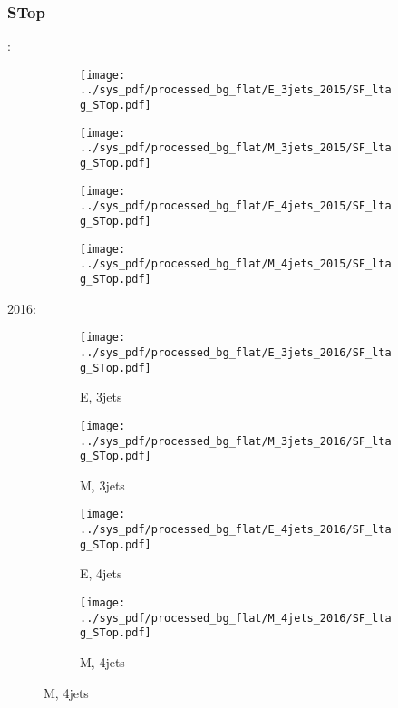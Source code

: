 \documentclass{beamer}
\begin{document}
\begin{frame}
\frametitle{STop}
\fontsize{5}{1}:
\begin{figure}
\centering
\begin{subfigure}[b]{0.24\textwidth}
\texttt{[image: ../sys\_pdf/processed\_bg\_flat/E\_3jets\_2015/SF\_ltag\_STop.pdf]}
\end{subfigure}
\begin{subfigure}[b]{0.24\textwidth}
\texttt{[image: ../sys\_pdf/processed\_bg\_flat/M\_3jets\_2015/SF\_ltag\_STop.pdf]}
\end{subfigure}
\begin{subfigure}[b]{0.24\textwidth}
\texttt{[image: ../sys\_pdf/processed\_bg\_flat/E\_4jets\_2015/SF\_ltag\_STop.pdf]}
\end{subfigure}
\begin{subfigure}[b]{0.24\textwidth}
\texttt{[image: ../sys\_pdf/processed\_bg\_flat/M\_4jets\_2015/SF\_ltag\_STop.pdf]}
\end{subfigure}
\end{figure}
2016:
\begin{figure}
\centering
\begin{subfigure}[b]{0.24\textwidth}
\texttt{[image: ../sys\_pdf/processed\_bg\_flat/E\_3jets\_2016/SF\_ltag\_STop.pdf]}
\captionsetup{font=tiny}
\caption{E, 3jets}
\end{subfigure}
\begin{subfigure}[b]{0.24\textwidth}
\texttt{[image: ../sys\_pdf/processed\_bg\_flat/M\_3jets\_2016/SF\_ltag\_STop.pdf]}
\captionsetup{font=tiny}
\caption{M, 3jets}
\end{subfigure}
\begin{subfigure}[b]{0.24\textwidth}
\texttt{[image: ../sys\_pdf/processed\_bg\_flat/E\_4jets\_2016/SF\_ltag\_STop.pdf]}
\captionsetup{font=tiny}
\caption{E, 4jets}
\end{subfigure}
\begin{subfigure}[b]{0.24\textwidth}
\texttt{[image: ../sys\_pdf/processed\_bg\_flat/M\_4jets\_2016/SF\_ltag\_STop.pdf]}
\captionsetup{font=tiny}
\caption{M, 4jets}
\end{subfigure}
\end{figure}
\end{frame}
\end{document}
